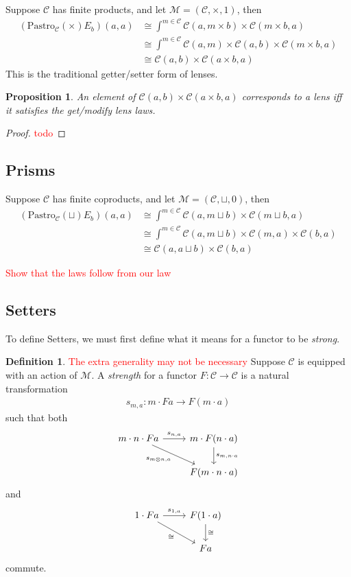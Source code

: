 \documentclass[11pt,a4paper]{amsart}
\theoremstyle{plain}
\newtheorem{proposition}[theorem]{Proposition}
\theoremstyle{definition}
\newtheorem{definition}[theorem]{Definition}
\newcommand{\C}{\mathscr{C}}
\newcommand{\M}{\mathscr{M}}
\newcommand{\Pastro}{\mathrm{Pastro}}
\newcommand{\todo}[1]{\textcolor{red}{\small #1}}
\begin{document}
Suppose $\C$ has finite products, and let $\M = (\C, \times, 1)$, then
\begin{align*}
(\Pastro_\C(\times)E_b)(a,a) 
&\cong \int^{m \in \C} \C(a, m \times b) \times \C(m \times b, a) \\
&\cong \int^{m \in \C} \C(a, m) \times \C(a, b) \times \C(m \times b, a) \\
&\cong  \C(a, b) \times \C(a \times b, a)
\end{align*}
This is the traditional getter/setter form of lenses. 

\begin{proposition}
An element of $\C(a, b) \times \C(a \times b, a)$ corresponds to a lens iff it satisfies the get/modify lens laws.
\end{proposition}
\begin{proof}
\todo{todo}
\end{proof}

\subsection{Prisms}

Suppose $\C$ has finite coproducts, and let $\M = (\C, \sqcup, 0)$, then
\begin{align*}
(\Pastro_\C(\sqcup)E_b)(a,a) 
&\cong \int^{m \in \C} \C(a, m \sqcup b) \times \C(m \sqcup b, a) \\
&\cong \int^{m \in \C} \C(a, m \sqcup b) \times \C(m, a) \times \C(b, a) \\
&\cong \C(a, a \sqcup b) \times \C(b, a)
\end{align*}

\todo{Show that the laws follow from our law}

\subsection{Setters}
To define Setters, we must first define what it means for a functor to be \emph{strong}.

\begin{definition}
\todo{The extra generality may not be necessary}
Suppose $\C$ is equipped with an action of $\M$. A \emph{strength} for a functor $F : \C \to \C$ is a natural transformation
\begin{align*}
s_{m,a} : m \cdot F a \to F(m \cdot a)
\end{align*}
such that both
\[
\begin{tikzcd}
m \cdot n \cdot Fa \ar[r, "s_{n,a}"] \ar[dr, "s_{m\otimes n, a}" below left]  & m \cdot F(n\cdot a) \ar[d, "s_{m, n\cdot a}" right] \\
& F(m \cdot n \cdot a)
\end{tikzcd}
\]
and
\[
\begin{tikzcd}
1 \cdot F a \ar[r, "s_{1,a}"] \ar[dr, "\cong" below left]  & F(1 \cdot a) \ar[d, "\cong" right] \\
& F a
\end{tikzcd}
\]
commute.
\end{definition}
\end{document}
